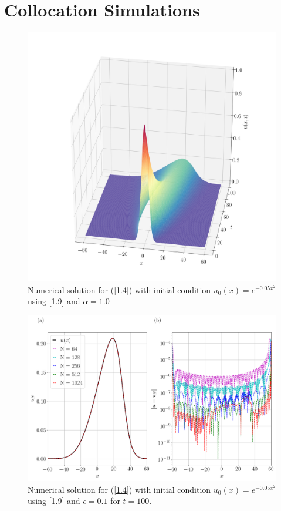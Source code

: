 \section{Collocation Simulations}
	\begin{figure}
		\includegraphics[width=\textwidth]{Figures/Collocation/Graphics/eps=1.0/Numerical_Solution_alpha=1.png}
		\caption{Numerical solution for (\ref{1.4}) with initial condition $u_0 (x) = e^{- 0.05 x^2}$ using \ref{1.9} and $\alpha = 1.0$}
		\label{Exact_Solution1}
	\end{figure}
	\begin{figure}
		\includegraphics[width=\textwidth]{Figures/Collocation/Graphics/eps=1.0/Numerical_Solution_alpha=1_T=100.png}
		\caption{Numerical solution for (\ref{1.4}) with initial condition $u_0 (x) = e^{- 0.05 x^2}$ using \ref{1.9} and $\epsilon = 0.1$ for $t = 100$.}
		\label{Exact_Solution}
	\end{figure}
